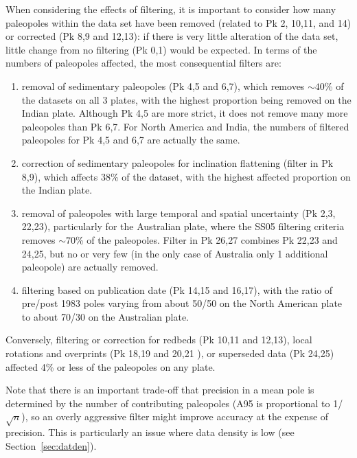 When considering the effects of filtering, it is important to consider how many
paleopoles within the data set have been removed (related to Pk 2,
10,11, and 14) or corrected (Pk 8,9 and 12,13): if there is very
little alteration of the data set, little change from no filtering (Pk 0,1)
would be expected. In terms of the numbers of paleopoles affected, the most
consequential filters are:
%
\begin{enumerate}
  \item removal of sedimentary paleopoles (Pk 4,5 and 6,7), which removes
		${\sim}40$\% of the datasets on all 3 plates, with the
		highest proportion being removed on the Indian plate. Although Pk 4,5
		are more strict, it does not remove many more paleopoles than Pk 6,7.
		For North America and India, the numbers of filtered paleopoles for Pk
		4,5 and 6,7 are actually the same.
  \item correction of sedimentary paleopoles for inclination flattening (filter
		in Pk 8,9), which affects 38\% of the dataset, with the
		highest affected proportion on the Indian plate.
  \item removal of paleopoles with large temporal and spatial uncertainty (Pk
		2,3, 22,23), particularly for the Australian plate, where the SS05
		filtering criteria removes ${\sim}70$\% of the paleopoles. Filter in Pk
		26,27 combines Pk 22,23 and 24,25, but no or very few (in the only case
		of Australia only 1 additional paleopole) are actually removed.
  \item filtering based on publication date (Pk 14,15 and 16,17), with the
		ratio of pre/post 1983 poles varying from about 50/50 on the North
		American plate to about 70/30 on the Australian plate.
\end{enumerate}

Conversely, filtering or correction for redbeds (Pk 10,11 and 12,13), local
rotations and overprints (Pk 18,19 and 20,21%
), or superseded data (Pk 24,25) affected 4\% or less of
the paleopoles on any plate.

Note that there is an important trade-off that precision in a mean pole is
determined by the number of contributing paleopoles (A95 is proportional to
1/$\sqrt{n}$), so an overly aggressive filter might improve accuracy at the
expense of precision. This is particularly an issue where data density is low
(see Section~\ref{sec:datden}).

